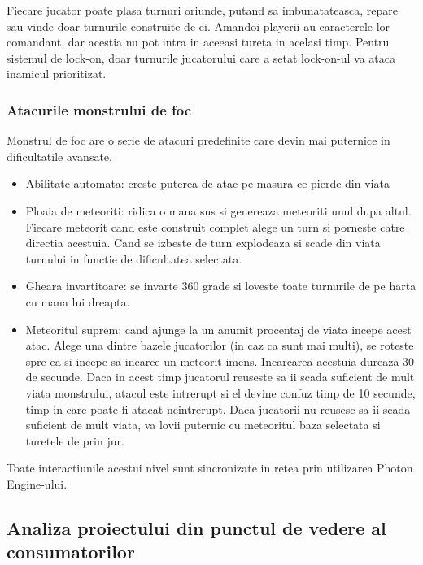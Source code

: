 \documentclass[12pt, a4paper]{article}
\begin{document}
	Fiecare jucator poate plasa turnuri oriunde, putand sa imbunatateasca, repare sau vinde doar turnurile construite de ei. Amandoi playerii au caracterele lor comandant, dar acestia nu pot intra in aceeasi tureta in acelasi timp. Pentru sistemul de lock-on, doar turnurile jucatorului care a setat lock-on-ul va ataca inamicul prioritizat.
	
	
	
	
	
	\subsubsection{Atacurile monstrului de foc}
	
	Monstrul de foc are o serie de atacuri predefinite care devin mai puternice in dificultatile avansate.
	
	\begin{itemize}
		\item Abilitate automata: creste puterea de atac pe masura ce pierde din viata
		\item Ploaia de meteoriti: ridica o mana sus si genereaza meteoriti unul dupa altul. Fiecare meteorit cand este construit complet alege un turn si porneste catre directia acestuia. Cand se izbeste de turn explodeaza si scade din viata turnului in functie de dificultatea selectata.
		\item Gheara invartitoare: se invarte 360 grade si loveste toate turnurile de pe harta cu mana lui dreapta.
		\item Meteoritul suprem: cand ajunge la un anumit procentaj de viata incepe acest atac. Alege una dintre bazele jucatorilor (in caz ca sunt mai multi), se roteste spre ea si incepe sa incarce un meteorit imens. Incarcarea acestuia dureaza 30 de secunde. Daca in acest timp jucatorul reuseste sa ii scada suficient de mult viata monstrului, atacul este intrerupt si el devine confuz timp de 10 secunde, timp in care poate fi atacat neintrerupt. Daca jucatorii nu reusesc sa ii scada suficient de mult viata, va lovii puternic cu meteoritul baza selectata si turetele de prin jur.
	\end{itemize}

	Toate interactiunile acestui nivel sunt sincronizate in retea prin utilizarea Photon Engine-ului.
	
	
	
	
	
	\subsection{Analiza proiectului din punctul de vedere al consumatorilor}
	
\end{document}

